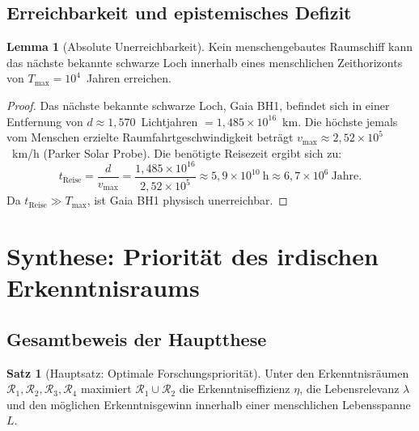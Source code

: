 ﻿\documentclass[a4paper,12pt]{article}
\theoremstyle{definition}
\newtheorem{satz}{Satz}
\newtheorem{lemma}{Lemma}
\begin{document}
\subsection{Erreichbarkeit und epistemisches Defizit}

\begin{lemma}[Absolute Unerreichbarkeit]
\label{lem:unerreichbarkeit}
    Kein menschengebautes Raumschiff kann das nächste bekannte schwarze Loch
    innerhalb eines menschlichen Zeithorizonts von $T_{\max} = 10^4$~Jahren
    erreichen.
\end{lemma}

\begin{proof}
    Das nächste bekannte schwarze Loch, Gaia BH1, befindet sich in einer
    Entfernung von $d \approx 1{,}570$~Lichtjahren $= 1{,}485 \times 10^{16}$~km.
    Die höchste jemals vom Menschen erzielte Raumfahrtgeschwindigkeit beträgt
    $v_{\max} \approx 2{,}52 \times 10^5$~km/h (Parker Solar Probe).
    Die benötigte Reisezeit ergibt sich zu:
    \[
        t_{\text{Reise}} = \frac{d}{v_{\max}}
        = \frac{1{,}485 \times 10^{16}}{2{,}52 \times 10^5}
        \approx 5{,}9 \times 10^{10}~\text{h}
        \approx 6{,}7 \times 10^6~\text{Jahre}.
    \]
    Da $t_{\text{Reise}} \gg T_{\max}$, ist Gaia BH1 physisch unerreichbar.
    \qedhere
\end{proof}

\section{Synthese: Priorität des irdischen Erkenntnisraums}

\subsection{Gesamtbeweis der Hauptthese}

\begin{satz}[Hauptsatz: Optimale Forschungspriorität]
\label{satz:hauptsatz}
    Unter den Erkenntnisräumen $\mathcal{R}_1, \mathcal{R}_2, \mathcal{R}_3,
    \mathcal{R}_4$ maximiert $\mathcal{R}_1 \cup \mathcal{R}_2$ die
    Erkenntniseffizienz $\eta$, die Lebensrelevanz $\lambda$ und den
    möglichen Erkenntnisgewinn innerhalb einer menschlichen Lebensspanne $L$.
\end{satz}
\end{document}
